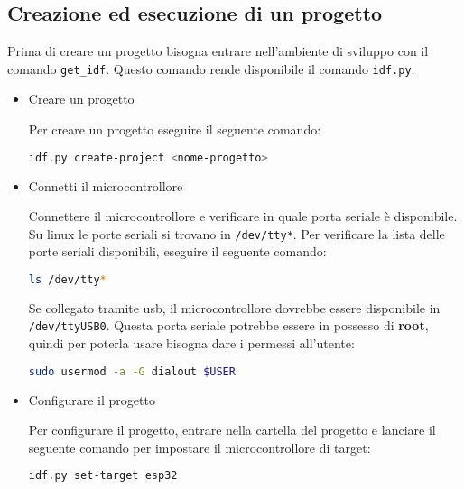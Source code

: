 \documentclass[a4paper]{article}
\begin{document}
\subsection{Creazione ed esecuzione di un progetto}
Prima di creare un progetto bisogna entrare nell'ambiente di sviluppo con il comando
\lstinline{get_idf}. Questo comando rende disponibile il comando \lstinline{idf.py}.
\begin{itemize}
  \item Creare un progetto

    \vspace{1em}
    \noindent
    Per creare un progetto eseguire il seguente comando:

\begin{lstlisting}[language=Bash]
idf.py create-project <nome-progetto>
\end{lstlisting}
    
  \item Connetti il microcontrollore

    \vspace{1em}
    \noindent
    Connettere il microcontrollore e verificare in quale porta seriale è disponibile.
    Su linux le porte seriali si trovano in \lstinline{/dev/tty*}. Per verificare la
    lista delle porte seriali disponibili, eseguire il seguente comando:

\begin{lstlisting}[language=Bash]
ls /dev/tty*
\end{lstlisting}
      
    Se collegato tramite usb, il microcontrollore dovrebbe essere disponibile in
    \lstinline{/dev/ttyUSB0}. Questa porta seriale potrebbe essere in possesso di
    \textbf{root}, quindi per poterla usare bisogna dare i permessi all'utente:

\begin{lstlisting}[language=Bash]
sudo usermod -a -G dialout $USER
\end{lstlisting}

  \item Configurare il progetto

    \vspace{1em}
    \noindent
    Per configurare il progetto, entrare nella cartella del progetto e lanciare il
    seguente comando per impostare il microcontrollore di target:

\begin{lstlisting}[language=Bash]
idf.py set-target esp32
\end{lstlisting}


\end{itemize}
\end{document}
